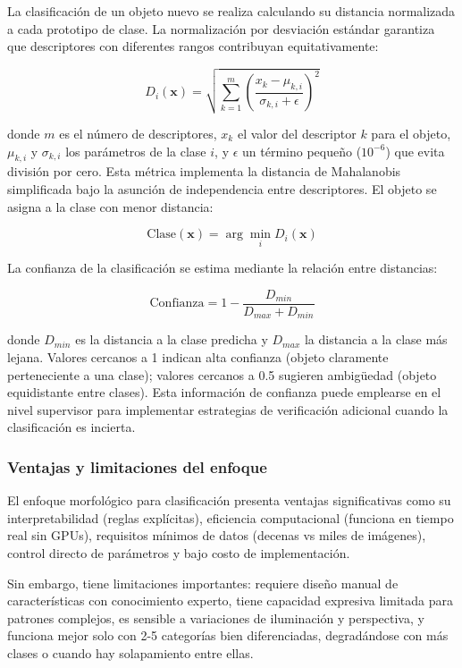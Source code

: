 La clasificación de un objeto nuevo se realiza calculando su distancia normalizada a cada prototipo de clase. La normalización por desviación estándar garantiza que descriptores con diferentes rangos contribuyan equitativamente:

\begin{equation}
D_i(\mathbf{x}) = \sqrt{\sum_{k=1}^{m} \left(\frac{x_k - \mu_{k,i}}{\sigma_{k,i} + \epsilon}\right)^2}
\end{equation}

donde $m$ es el número de descriptores, $x_k$ el valor del descriptor $k$ para el objeto, $\mu_{k,i}$ y $\sigma_{k,i}$ los parámetros de la clase $i$, y $\epsilon$ un término pequeño ($10^{-6}$) que evita división por cero. Esta métrica implementa la distancia de Mahalanobis simplificada bajo la asunción de independencia entre descriptores. El objeto se asigna a la clase con menor distancia:

\begin{equation}
\text{Clase}(\mathbf{x}) = \arg\min_{i} D_i(\mathbf{x})
\end{equation}

La confianza de la clasificación se estima mediante la relación entre distancias:

\begin{equation}
\text{Confianza} = 1 - \frac{D_{min}}{D_{max} + D_{min}}
\end{equation}

donde $D_{min}$ es la distancia a la clase predicha y $D_{max}$ la distancia a la clase más lejana. Valores cercanos a 1 indican alta confianza (objeto claramente perteneciente a una clase); valores cercanos a 0.5 sugieren ambigüedad (objeto equidistante entre clases). Esta información de confianza puede emplearse en el nivel supervisor para implementar estrategias de verificación adicional cuando la clasificación es incierta.

\subsubsection{Ventajas y limitaciones del enfoque}

El enfoque morfológico para clasificación presenta ventajas significativas como su interpretabilidad (reglas explícitas), eficiencia computacional (funciona en tiempo real sin GPUs), requisitos mínimos de datos (decenas vs miles de imágenes), control directo de parámetros y bajo costo de implementación.

Sin embargo, tiene limitaciones importantes: requiere diseño manual de características con conocimiento experto, tiene capacidad expresiva limitada para patrones complejos, es sensible a variaciones de iluminación y perspectiva, y funciona mejor solo con 2-5 categorías bien diferenciadas, degradándose con más clases o cuando hay solapamiento entre ellas.

